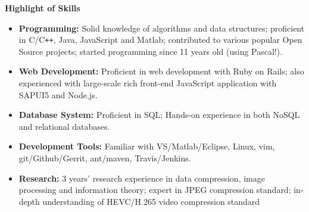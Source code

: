 \documentclass[letterpaper,10pt]{article}
\newcommand{\resheading}[1]{{\large \colorbox{mygrey}{\begin{minipage}{\textwidth}{\textbf{#1 \vphantom{p\^{E}}}}\end{minipage}}}}
\begin{document}
\resheading{Highlight of Skills}
\begin{itemize}
\itemsep0em
\item {\textbf {Programming:}} Solid knowledge of algorithms and data structures; proficient in C/C{}\verb!++!, Java, JavaScript and Matlab; contributed to various popular Open Source projects; started programming since 11 years old (using Pascal!).
\item{\textbf {Web Development:}} Proficient in web development with Ruby on Rails; also experienced with large-scale rich front-end JavaScript application with SAPUI5 and Node.js.
\item{\textbf {Database System:}} Proficient in SQL; Hands-on experience in both NoSQL and relational databases.
\item{\textbf {Development Tools:}} Familiar with VS/Matlab/Eclipse, Linux, vim, git/Github/Gerrit, ant/maven, Travis/Jenkins.
\item{\textbf {Research:}} 3 years' research experience in data compression, image processing and information theory; expert in JPEG compression standard; in-depth understanding of HEVC/H.265 video compression standard

\end{itemize}
\end{document}
